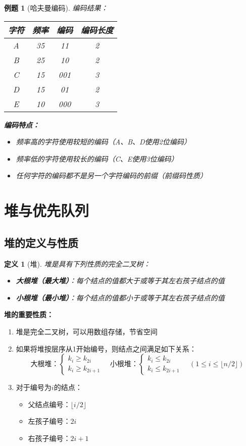 \documentclass[12pt,a4paper]{amsart}
\newtheorem{definition}{定义}[section]
\newtheorem{example}{例题}[section]
\begin{document}
\begin{example}[哈夫曼编码]
编码结果：
\begin{center}
\begin{tabular}{|c|c|c|c|}
\hline
字符 & 频率 & 编码 & 编码长度 \\
\hline
A & 35 & 11 & 2 \\
B & 25 & 10 & 2 \\
C & 15 & 001 & 3 \\
D & 15 & 01 & 2 \\
E & 10 & 000 & 3 \\
\hline
\end{tabular}
\end{center}

\textbf{编码特点：}
\begin{itemize}
\item 频率高的字符使用较短的编码（A、B、D使用2位编码）
\item 频率低的字符使用较长的编码（C、E使用3位编码）
\item 任何字符的编码都不是另一个字符编码的前缀（前缀码性质）
\end{itemize}
\end{example}

\section{堆与优先队列}

\subsection{堆的定义与性质}

\begin{definition}[堆]
堆是具有下列性质的完全二叉树：
\begin{itemize}
\item \textbf{大根堆（最大堆）}：每个结点的值都大于或等于其左右孩子结点的值
\item \textbf{小根堆（最小堆）}：每个结点的值都小于或等于其左右孩子结点的值
\end{itemize}
\end{definition}

\textbf{堆的重要性质：}
\begin{enumerate}
\item 堆是完全二叉树，可以用数组存储，节省空间
\item 如果将堆按层序从1开始编号，则结点之间满足如下关系：
$$\text{大根堆：}\begin{cases}
k_i \geq k_{2i} \\
k_i \geq k_{2i+1}
\end{cases} \quad \text{小根堆：}\begin{cases}
k_i \leq k_{2i} \\
k_i \leq k_{2i+1}
\end{cases} \quad (1 \leq i \leq \lfloor n/2 \rfloor)$$
\item 对于编号为$i$的结点：
\begin{itemize}
\item 父结点编号：$\lfloor i/2 \rfloor$
\item 左孩子编号：$2i$
\item 右孩子编号：$2i+1$
\end{itemize}
\end{enumerate}
\end{document}
